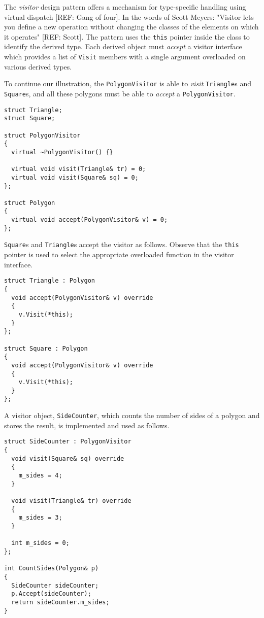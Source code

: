 \documentclass[10pt,a4paper]{article}
\newcommand\mycode[1]{{\small\texttt{#1}}}
\begin{document}
The \emph{visitor} design pattern offers a mechanism for type-specific handling
using virtual dispatch [REF: Gang of four]. In the words of Scott Meyers: 
"Visitor lets you define a new operation without changing the classes of the
elements on which it operates" [REF: Scott]. The pattern uses the \mycode{this}
pointer inside the class to identify the derived type. Each derived object must
\emph{accept} a visitor interface which provides a list of \mycode{Visit}
members with a single argument overloaded on various derived types.

To continue our illustration, the \mycode{PolygonVisitor} is able to
\emph{visit} \mycode{Triangle}s and \mycode{Square}s, and all these polygons
must be able to \emph{accept} a \mycode{PolygonVisitor}.

{\small\begin{verbatim} 
struct Triangle; 
struct Square;

struct PolygonVisitor 
{ 
  virtual ~PolygonVisitor() {}

  virtual void visit(Triangle& tr) = 0; 
  virtual void visit(Square& sq) = 0;
};

struct Polygon 
{ 
  virtual void accept(PolygonVisitor& v) = 0; 
};\end{verbatim}}

\mycode{Square}s and \mycode{Triangle}s accept the visitor as follows. Observe
that the \mycode{this} pointer is used to select the appropriate overloaded
function in the visitor interface.

{\small\begin{verbatim} 
struct Triangle : Polygon 
{ 
  void accept(PolygonVisitor& v) override 
  { 
    v.Visit(*this); 
  } 
};

struct Square : Polygon 
{ 
  void accept(PolygonVisitor& v) override 
  {
    v.Visit(*this); 
  } 
};\end{verbatim}}

A visitor object, \mycode{SideCounter}, which counts the number of sides of a
polygon and stores the result, is implemented and used as follows.

{\small\begin{verbatim} 
struct SideCounter : PolygonVisitor 
{ 
  void visit(Square& sq) override 
  { 
    m_sides = 4; 
  }
  
  void visit(Triangle& tr) override 
  { 
    m_sides = 3; 
  }
  
  int m_sides = 0; 
};

int CountSides(Polygon& p) 
{ 
  SideCounter sideCounter; 
  p.Accept(sideCounter);
  return sideCounter.m_sides; 
}\end{verbatim}}
\end{document}
